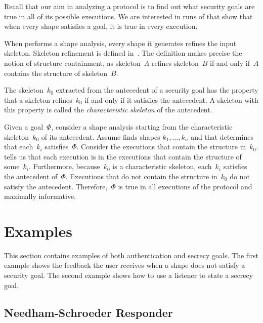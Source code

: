 \documentclass[12pt]{article}
\begin{document}
Recall that our aim in analyzing a protocol is to find out what
security goals are true in all of its possible executions.  We are
interested in runs of {\cpsa} that show that when every shape
satisfies a goal, it is true in every execution.

When {\cpsa} performs a shape analysis, every shape it generates
refines the input skeleton.  Skeleton refinement is defined
in~\cite[Section~6]{cpsaprimer09}.  The definition makes precise the
notion of structure containment, as skeleton~$A$ refines skeleton~$B$
if and only if~$A$ contains the structure of skeleton~$B$.

The skeleton~$k_0$ extracted from the antecedent of a security goal
has the property that a skeleton refines~$k_0$ if and only if it
satisfies the antecedent.  A skeleton with this property is called the
\emph{characteristic skeleton} of the antecedent.

Given a goal~\(\Phi\), consider a shape analysis starting from the
characteristic skeleton~$k_0$ of its antecedent.  Assume {\cpsa} finds
shapes $k_1,\ldots,k_n$ and that {\cpsa} determines that each~$k_i$
satisfies~$\Phi$.  Consider the executions that contain the structure
in~$k_0$.  {\cpsa} tells us that each execution is in the executions
that contain the structure of some~$k_i$.  Furthermore, because~$k_0$
is a characteristic skeleton, each~$k_i$ satisfies the antecedent
of~$\Phi$.  Executions that do not contain the structure in~$k_0$ do
not satisfy the antecedent.  Therefore,~$\Phi$ is true in all
executions of the protocol and maximally informative.

\section{Examples}\label{sec:examples}

This section contains examples of both authentication and secrecy
goals.  The first example shows the feedback the user receives when a
shape does not satisfy a security goal.  The second example shows how
to use a listener to state a secrecy goal.

\subsection{Needham-Schroeder Responder}\label{sec:ns resp}
\end{document}
